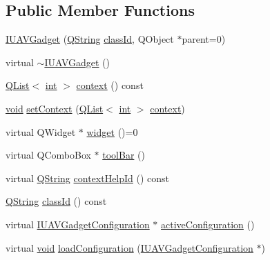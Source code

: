 \subsection*{Public Member Functions}
\begin{DoxyCompactItemize}
\item 
\hyperlink{group___core_plugin_gab05dd4230eb4f599db6c08439bc6216c}{I\-U\-A\-V\-Gadget} (\hyperlink{group___u_a_v_objects_plugin_gab9d252f49c333c94a72f97ce3105a32d}{Q\-String} \hyperlink{group___core_plugin_ga3878fde66a57220608960bcc3fbeef2c}{class\-Id}, Q\-Object $\ast$parent=0)
\item 
virtual \hyperlink{group___core_plugin_ga817ce9cba005f49f5da1d0e5daca2fa4}{$\sim$\-I\-U\-A\-V\-Gadget} ()
\item 
\hyperlink{class_q_list}{Q\-List}$<$ \hyperlink{ioapi_8h_a787fa3cf048117ba7123753c1e74fcd6}{int} $>$ \hyperlink{group___core_plugin_gaaed028d1293022d86c3ccba4c1d3c4e7}{context} () const 
\item 
\hyperlink{group___u_a_v_objects_plugin_ga444cf2ff3f0ecbe028adce838d373f5c}{void} \hyperlink{group___core_plugin_ga90502d49b96520b41d1f55429144cb74}{set\-Context} (\hyperlink{class_q_list}{Q\-List}$<$ \hyperlink{ioapi_8h_a787fa3cf048117ba7123753c1e74fcd6}{int} $>$ \hyperlink{group___core_plugin_gaaed028d1293022d86c3ccba4c1d3c4e7}{context})
\item 
virtual Q\-Widget $\ast$ \hyperlink{group___core_plugin_gac74c76eef51e24e62a333fe0fd940cf6}{widget} ()=0
\item 
virtual Q\-Combo\-Box $\ast$ \hyperlink{group___core_plugin_ga96a26c85897a679529b1fc59d8c0edcd}{tool\-Bar} ()
\item 
virtual \hyperlink{group___u_a_v_objects_plugin_gab9d252f49c333c94a72f97ce3105a32d}{Q\-String} \hyperlink{group___core_plugin_ga27d0b6b967ad954602eb54eecc5dbdd1}{context\-Help\-Id} () const 
\item 
\hyperlink{group___u_a_v_objects_plugin_gab9d252f49c333c94a72f97ce3105a32d}{Q\-String} \hyperlink{group___core_plugin_ga3878fde66a57220608960bcc3fbeef2c}{class\-Id} () const 
\item 
virtual \hyperlink{class_core_1_1_i_u_a_v_gadget_configuration}{I\-U\-A\-V\-Gadget\-Configuration} $\ast$ \hyperlink{group___core_plugin_gaae57a0547d1a44549001909d0f3d8ccc}{active\-Configuration} ()
\item 
virtual \hyperlink{group___u_a_v_objects_plugin_ga444cf2ff3f0ecbe028adce838d373f5c}{void} \hyperlink{group___core_plugin_gaaf60a82b8643f54a42381600c52bbe8a}{load\-Configuration} (\hyperlink{class_core_1_1_i_u_a_v_gadget_configuration}{I\-U\-A\-V\-Gadget\-Configuration} $\ast$)

\end{DoxyCompactItemize}
